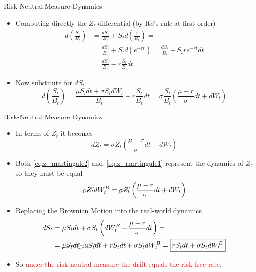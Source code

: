 \documentclass{beamer}
\begin{document}
\begin{frame}{Risk-Neutral Measure Dynamics}
  \begin{itemize}
  \item<1-> Computing directly the $Z_t$ differential (by It$\hat{o}$'s rule at first order)
    \begin{equation*}
      \begin{aligned}
	d\left(\frac{S_t}{B_t}\right) &= \frac{dS_t}{B_t} + S_t d\left(\frac{1}{B_t}\right) = \\ 
	&=\frac{dS_t}{B_t} + S_t d\left(e^{-rt}\right) = \frac{dS_t}{B_t} - S_t re^{-rt}dt \\
	&= \frac{dS_t}{B_t} - r\frac{S_t}{B_t}dt 
      \end{aligned}
    \end{equation*}
  \item<2-> Now substitute for $dS_t$
    \begin{equation*}
      d\left(\frac{S_t}{B_t}\right)= \frac{ \mu S_t dt + \sigma S_t dW_t}{B_t} - r\frac{S_t}{B_t}dt = \sigma\frac{S_t}{B_t}\left(\frac{\mu - r}{\sigma}dt + dW_t \right)
    \end{equation*}	
  \end{itemize}
\end{frame}

\begin{frame}{Risk-Neutral Measure Dynamics}
  \begin{itemize}
  \item<1-> In terms of $Z_t$ it becomes
    \begin{equation}
      dZ_t = \sigma Z_t\left(\frac{\mu - r}{\sigma}dt + dW_t \right)
      \label{eq:z_martingale2}
    \end{equation}
  \item<2-> Both \cref{eq:z_martingale2} and~\cref{eq:z_martingale1} represent the dynamics of $Z_t$ so they must be equal
    \begin{equation*}
      \cancel{\sigma Z_t}dW_t^B = \cancel{\sigma Z_t}\left(\frac{\mu - r}{\sigma}dt + dW_t\right)
    \end{equation*}
  \item<3-> Replacing the Brownian Motion into the real-world dynamics
    \begin{equation*}
      \begin{aligned}
	dS_t &= \mu S_t dt + \sigma S_t \left(dW_t^B - \frac{\mu - r}{\sigma}dt\right) =\\
	& = \cancel{\mu S_t dt} \cancel{-\mu S_t dt} + rS_t dt + \sigma S_t dW_t^B  = \boxed{rS_t dt + \sigma S_t dW_t^B}
      \end{aligned}
    \end{equation*}
  \item<4-> So \textcolor{red}{under the risk-neutral measure the drift equals the risk-free rate}.
  \end{itemize}
\end{frame}
\end{document}
